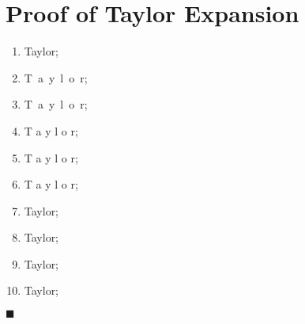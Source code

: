 \documentclass[12pt, titlepage,french]{article}
\begin{document}
\section{Proof of Taylor Expansion}

\begin{distributions}[Proof]
\begin{enumerate}[label = \roman*.]
	\item	Taylor;
	\item	T\ a\ y\ l\ o\ r;
	\item	T\, a\, y\, l\, o\, r;
	\item	T\: a\: y\: l\: o\: r;
	\item	T\; a\; y\; l\; o\; r;
	\item	T\;\; a\;\; y\;\; l\;\; o\;\; r;
	\item	T\;\;\quad a\;\;\quad y\;\;\quad l\;\;\quad o\;\;\quad r;
	\item	T\;\;\quad\quad a\;\;\quad\quad y\;\;\quad\quad l\;\;\quad\quad o\;\;\quad\quad r;
	\item	T\;\;\quad\quad\quad a\;\;\quad\quad\quad y\;\;\quad\quad\quad l\;\;\quad\quad\quad o\;\;\quad\quad\quad r;
	\item	T\;\;\quad\quad\quad\quad a\;\;\quad\quad\quad\quad y\;\;\quad\quad\quad\quad l\;\;\quad\quad\quad\quad o\;\;\quad\quad\quad\quad r;
\end{enumerate}
\end{distributions}
$\blacksquare$

\clearpage
\end{document}
